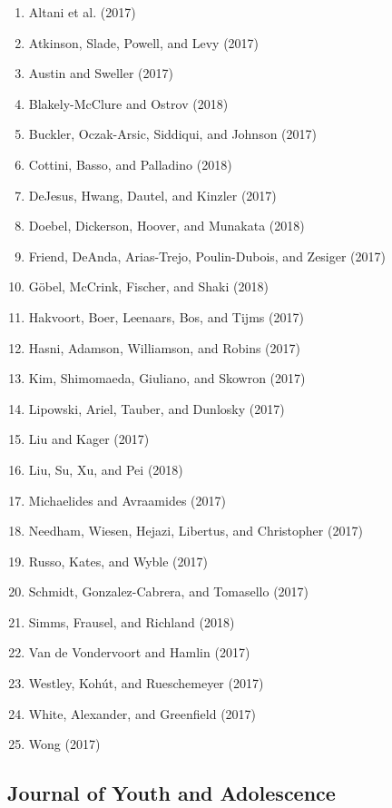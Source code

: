 \documentclass[english,man]{apa6}
\providecommand{\tightlist}{%
  \setlength{\itemsep}{0pt}\setlength{\parskip}{0pt}}
\begin{document}
\begin{enumerate}
\def\labelenumi{\arabic{enumi})}
\tightlist
\item
  Altani et al. (2017)
\item
  Atkinson, Slade, Powell, and Levy (2017)
\item
  Austin and Sweller (2017)
\item
  Blakely-McClure and Ostrov (2018)
\item
  Buckler, Oczak-Arsic, Siddiqui, and Johnson (2017)
\item
  Cottini, Basso, and Palladino (2018)
\item
  DeJesus, Hwang, Dautel, and Kinzler (2017)
\item
  Doebel, Dickerson, Hoover, and Munakata (2018)
\item
  Friend, DeAnda, Arias-Trejo, Poulin-Dubois, and Zesiger (2017)
\item
  Göbel, McCrink, Fischer, and Shaki (2018)
\item
  Hakvoort, Boer, Leenaars, Bos, and Tijms (2017)
\item
  Hasni, Adamson, Williamson, and Robins (2017)
\item
  Kim, Shimomaeda, Giuliano, and Skowron (2017)
\item
  Lipowski, Ariel, Tauber, and Dunlosky (2017)
\item
  Liu and Kager (2017)
\item
  Liu, Su, Xu, and Pei (2018)
\item
  Michaelides and Avraamides (2017)
\item
  Needham, Wiesen, Hejazi, Libertus, and Christopher (2017)
\item
  Russo, Kates, and Wyble (2017)
\item
  Schmidt, Gonzalez-Cabrera, and Tomasello (2017)
\item
  Simms, Frausel, and Richland (2018)
\item
  Van de Vondervoort and Hamlin (2017)
\item
  Westley, Kohút, and Rueschemeyer (2017)
\item
  White, Alexander, and Greenfield (2017)
\item
  Wong (2017)
\end{enumerate}

\subsection{Journal of Youth and
Adolescence}\label{journal-of-youth-and-adolescence}
\end{document}
